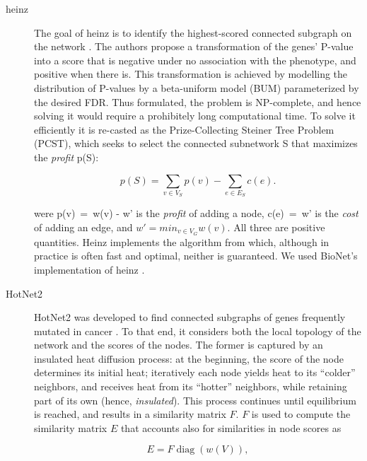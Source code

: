 \documentclass[twocolumn, 11pt]{article}
\begin{document}
\begin{description}
\item[{heinz}] The goal of heinz is to identify the highest-scored connected subgraph on the network \cite{dittrich_identifying_2008}. The authors propose a transformation of the genes' P-value into a score that is negative under no association with the phenotype, and positive when there is. This transformation is achieved by modelling the distribution of P-values by a beta-uniform model (BUM) parameterized by the desired FDR. Thus formulated, the problem is NP-complete, and hence solving it would require a prohibitely long computational time. To solve it efficiently it is re-casted as the Prize-Collecting Steiner Tree Problem (PCST), which seeks to select the connected subnetwork S that maximizes the \emph{profit} p(S):

\begin{equation*}
p(S) = \sum_{v \in V_S} p(v) - \sum_{e \in E_S} c(e). 
\end{equation*}

were p(v)~=~w(v) - w' is the \emph{profit} of adding a node, c(e)~=~w' is the \emph{cost} of adding an edge, and $w' = min_{v \in V_{G}} w(v)$. All three are positive quantities. Heinz implements the algorithm from \citet{ljubic_algorithmic_2006} which, although in practice is often fast and optimal, neither is guaranteed. We used BioNet's implementation of heinz \cite{beisser_bionet:_2010,heinz}.

\item[{HotNet2}] HotNet2 was developed to find connected subgraphs of genes frequently mutated in cancer \cite{leiserson_pan-cancer_2015}. To that end, it considers both the local topology of the network and the scores of the nodes. The former is captured by an insulated heat diffusion process: at the beginning, the score of the node determines its initial heat; iteratively each node yields heat to its ``colder'' neighbors, and receives heat from its ``hotter'' neighbors, while retaining part of its own (hence, \emph{insulated}). This process continues until equilibrium is reached, and results in a similarity matrix $F$. $F$ is used to compute the similarity matrix $E$ that accounts also for similarities in node scores as 

\begin{equation*} 
E = F \operatorname{diag}(w(V)), 
\end{equation*}


\end{description}
\end{document}
